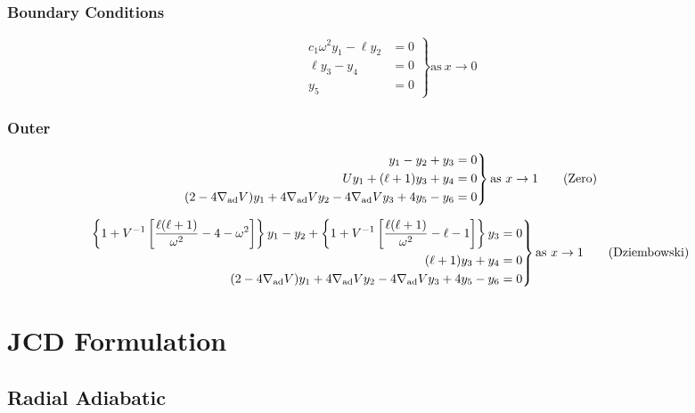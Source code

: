 \documentclass[fleqn]{article}
\newcommand{\nabad}{\ensuremath{\nabla_{\rm ad}}}
\begin{document}
\subsubsection*{Boundary Conditions}

\begin{equation*}
\left.
\begin{aligned}
c_{1} \omega^{2} y_{1} - \ell y_{2} &= 0 \\
\ell y_{3} - y_{4} &= 0 \\
y_{5} &= 0
\end{aligned}
\right\}
\text{as}\ x \rightarrow 0
\end{equation*}

\subsubsection*{Outer}

\begin{equation*}
\left.
\begin{aligned}
y_{1} - y_{2} + y_{3} &= 0 \\
U y_{1} + (\ell + 1) y_{3} + y_{4} &= 0 \\
(2 - 4\nabad V) y_{1} + 4 \nabad V y_{2} - 4 \nabad V y_{3} + 4 y_{5} - y_{6} &= 0
\end{aligned}
\right\}
\text{as}\ x \rightarrow 1 \qquad \text{(Zero)}
\end{equation*}

\begin{equation*}
\left.
\begin{aligned}
\left\{ 1 + V^{-1} \left[ \frac{\ell(\ell+1)}{\omega^{2}} - 4 - \omega^{2} \right] \right\} y_{1} -
y_{2} +
\left\{ 1 + V^{-1} \left[ \frac{\ell(\ell+1)}{\omega^{2}} - \ell - 1 \right] \right\} y_{3} &= 0 \\
(\ell + 1) y_{3} + y_{4} &= 0 \\
(2 - 4\nabad V) y_{1} + 4 \nabad V y_{2} - 4 \nabad V y_{3} + 4 y_{5} - y_{6} &= 0
\end{aligned}
\right\}
\text{as}\ x \rightarrow 1 \qquad \text{(Dziembowski)}
\end{equation*}


\newpage

\section*{JCD Formulation}

\subsection*{Radial Adiabatic}
\end{document}
